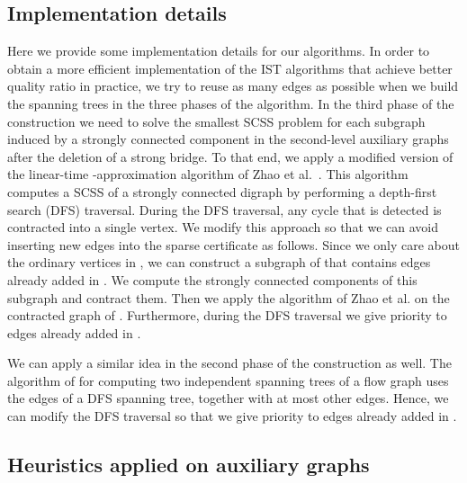 \documentclass[11pt]{article}
\begin{document}
\subsection{Implementation details}
\label{section:IST-implementation}

Here we provide some implementation details for our algorithms.
In order to obtain a more efficient implementation of the \textsf{IST} algorithms that achieve better quality ratio in practice,
we try to reuse as many edges as possible when we build the spanning trees in the three phases of the algorithm.
In the third phase of the construction we need to solve the smallest \textsf{SCSS} problem for each subgraph  induced by a strongly connected component  in the second-level auxiliary
graphs after the deletion of a strong bridge.
To that end, we apply a modified version of the linear-time -approximation algorithm of Zhao et al.~\cite{ZNI:MSCS:2003}.
This algorithm computes a  \textsf{SCSS} of a strongly connected digraph by performing a depth-first search (DFS) traversal.
During the DFS traversal, any cycle that is detected is contracted into a single vertex.
We modify this approach so that we can avoid inserting new edges into the sparse certificate as follows.
Since we only care about the ordinary vertices in , we can construct a subgraph of  that contains edges already added in .
We compute the strongly connected components of this subgraph and contract them. Then we apply the algorithm of Zhao et al. on the contracted graph of .
Furthermore, during the DFS traversal we give priority to edges already added in .

We can apply a similar idea in the second phase of the construction as well.
The algorithm of \cite{domv:gt05} for computing two independent spanning trees of a flow graph uses the edges of a DFS spanning tree, together with at most  other edges.
Hence, we can modify the DFS traversal so that we give priority to edges already added in .


\subsection{Heuristics applied on auxiliary graphs}
\label{section:auxiliary}
\end{document}
